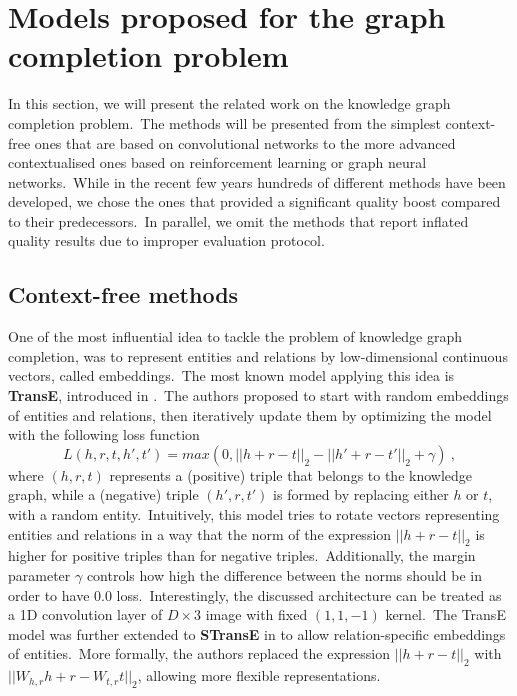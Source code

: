 \documentclass[longabstract, english, mgr]{iithesis}
\theoremstyle{default_theorem_style}\newtheorem{theorem}{Theorem}
\theoremstyle{default_theorem_style}\newtheorem{definition}{Definition}
\begin{document}
\section{Models proposed for the graph completion problem}\label{sec:background_models}

In this section, we will present the related work on the knowledge graph completion problem.\ The methods will be
presented from the simplest context-free ones that are based on convolutional networks to the more advanced
contextualised ones based on reinforcement learning or graph neural networks.\ While in the recent few years hundreds of
different methods have been developed, we chose the ones that provided a significant quality boost compared to their
predecessors.\ In parallel, we omit the methods that report inflated quality results due to improper evaluation
protocol.

\subsection{Context-free methods}

One of the most influential idea to tackle the problem of knowledge graph completion, was to represent entities and
relations by low-dimensional continuous vectors, called embeddings.\ The most known model applying this idea is
\textbf{TransE}, introduced in \cite{transe_model}.\ The authors proposed to
start with random embeddings of entities and relations, then iteratively update them by optimizing the model
with the following loss function
$$
L(h, r, t, h', t') = max(0, ||h + r - t||_2 - ||h' + r - t'||_2 + \gamma)\ ,
$$
where $(h, r, t)$ represents a (positive) triple that belongs to the knowledge graph, while a (negative) triple
$(h', r, t')$ is formed by replacing either $h$ or $t$, with a random entity.\ Intuitively, this model tries to
rotate vectors representing entities and relations in a way that the norm of the expression $||h + r - t||_2$ is higher
for positive triples than for negative triples.\ Additionally, the margin parameter $\gamma$ controls how high the
difference between the norms should be in order to have $0.0$ loss.\ Interestingly, the discussed architecture can be
treated as a 1D convolution layer of $D \times 3$ image with fixed $(1, 1, -1)$ kernel.\ The TransE model was
further extended to \textbf{STransE} in \cite{stranse_model} to allow relation-specific embeddings of entities.\ More
formally, the authors replaced the expression $||h + r - t||_2$ with $||W_{h,r} h + r - W_{t,r} t||_2$, allowing more
flexible representations.\newline
\end{document}
